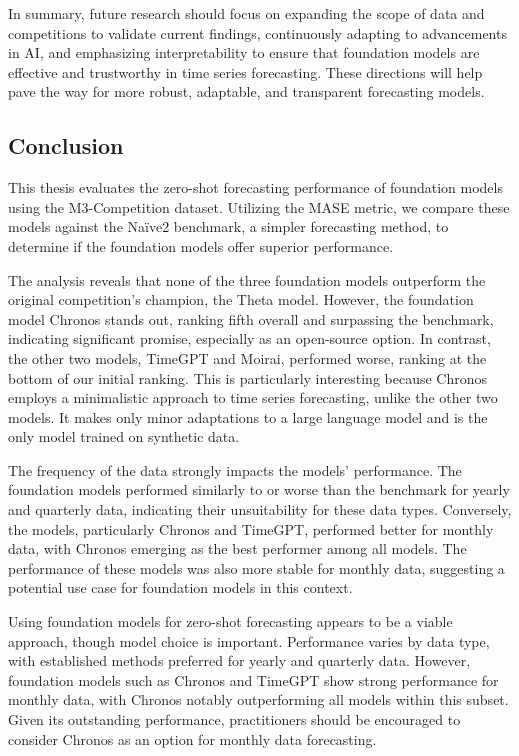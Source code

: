 \documentclass[12pt,a4paper]{article}
\begin{document}
In summary, future research should focus on expanding the scope of data and competitions to validate current findings, continuously adapting to advancements in AI, and emphasizing interpretability to ensure that foundation models are effective and trustworthy in time series forecasting. These directions will help pave the way for more robust, adaptable, and transparent forecasting models.

\begin{center}
  \item  \section{Conclusion}
\end{center}

This thesis evaluates the zero-shot forecasting performance of foundation models using the M3-Competition dataset. Utilizing the MASE metric, we compare these models against the Naïve2 benchmark, a simpler forecasting method, to determine if the foundation models offer superior performance.

The analysis reveals that none of the three foundation models outperform the original competition's champion, the Theta model. However, the foundation model Chronos stands out, ranking fifth overall and surpassing the benchmark, indicating significant promise, especially as an open-source option. In contrast, the other two models, TimeGPT and Moirai, performed worse, ranking at the bottom of our initial ranking. This is particularly interesting because Chronos employs a minimalistic approach to time series forecasting, unlike the other two models. It makes only minor adaptations to a large language model and is the only model trained on synthetic data.

The frequency of the data strongly impacts the models' performance. The foundation models performed similarly to or worse than the benchmark for yearly and quarterly data, indicating their unsuitability for these data types. Conversely, the models, particularly Chronos and TimeGPT, performed better for monthly data, with Chronos emerging as the best performer among all models. The performance of these models was also more stable for monthly data, suggesting a potential use case for foundation models in this context.

Using foundation models for zero-shot forecasting appears to be a viable approach, though model choice is important. Performance varies by data type, with established methods preferred for yearly and quarterly data. However, foundation models such as Chronos and TimeGPT show strong performance for monthly data, with Chronos notably outperforming all models within this subset. Given its outstanding performance, practitioners should be encouraged to consider Chronos as an option for monthly data forecasting. 
\end{document}
